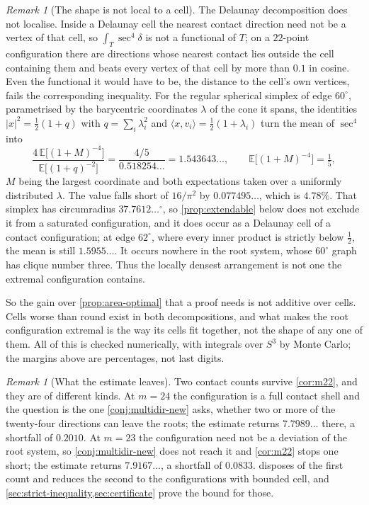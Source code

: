 \documentclass[11pt,reqno]{amsart}
\renewcommand{\_}{\origunderscore\allowbreak}
\numberwithin{equation}{section}
\theoremstyle{plain}
\theoremstyle{definition}
\theoremstyle{remark}
\newtheorem{remark}[thm]{Remark}
\begin{document}
\begin{remark}[The shape is not local to a cell]
The Delaunay decomposition does not localise. Inside a Delaunay
cell the nearest contact direction need not be a vertex of that cell, so
$\int_T\sec^4\delta$ is not a functional of $T$; on a $22$-point
configuration there are directions whose nearest contact lies outside
the cell containing them and beats every vertex of that cell by more
than $0.1$ in cosine. Even the functional it would have to be, the
distance to the cell's own vertices, fails the corresponding inequality.
For the regular spherical simplex of edge $60^\circ$, parametrised by
the barycentric coordinates $\lambda$ of the cone it spans, the
identities $|x|^2=\tfrac12(1+q)$ with $q=\sum_i\lambda_i^2$ and
$\langle x,v_i\rangle=\tfrac12(1+\lambda_i)$ turn the mean of $\sec^4$
into
\begin{equation}\label{eq:regular-simplex-mean}
  \frac{4\,\mathbb{E}\bigl[(1+M)^{-4}\bigr]}
       {\mathbb{E}\bigl[(1+q)^{-2}\bigr]}
  =\frac{4/5}{0.518254\ldots}=1.543643\ldots ,
  \qquad
  \mathbb{E}\bigl[(1+M)^{-4}\bigr]=\tfrac15 ,
\end{equation}
$M$ being the largest coordinate and both expectations taken over a
uniformly distributed $\lambda$. The value falls short of $16/\pi^2$ by
$0.077495\ldots$, which is $4.78\%$. That simplex has circumradius
$37.7612\ldots^\circ$, so \cref{prop:extendable} below does not exclude
it from a saturated configuration, and it does occur as a Delaunay cell
of a contact configuration; at edge $62^\circ$, where every inner
product is strictly below $\tfrac12$, the mean is still
$1.5955\ldots$. It occurs nowhere in the root system, whose $60^\circ$
graph has clique number three. Thus the
locally densest arrangement is not one the extremal configuration
contains.

So the gain over \cref{prop:area-optimal} that a proof needs is not
additive over cells. Cells worse than round exist in both
decompositions, and what makes the root configuration extremal is the way its cells fit together, not the shape of any one of them. All
of this is checked numerically, with integrals over $S^3$ by Monte Carlo; the
margins above are percentages, not last digits.
\end{remark}

\begin{remark}[What the estimate leaves]\label{rem:what-is-left}
Two contact counts survive \cref{cor:m22}, and they are of different
kinds. At $m=24$ the configuration is a full contact shell and the
question is the one \cref{conj:multidir-new} asks, whether two or more
of the twenty-four directions can leave the roots; the estimate returns
$7.7989\ldots$ there, a shortfall of $0.2010$. At $m=23$ the
configuration need not be a deviation of the root system, so
\cref{conj:multidir-new} does not reach it and \cref{cor:m22} stops one
short; the estimate returns $7.9167\ldots$, a shortfall of $0.0833$.
 disposes of the first count and reduces the second to
the configurations with bounded cell, and
\cref{sec:strict-inequality,sec:certificate} prove the bound for those.
\end{remark}
\end{document}
